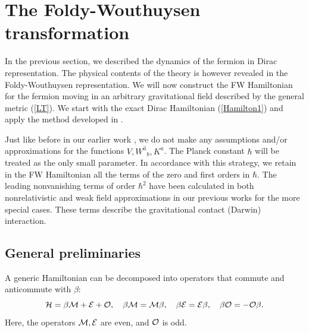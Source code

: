 \documentclass[preprint,showpacs,preprintnumbers,eqsecnum,amsmath,amssymb]{revtex4-1}
\begin{document}
\section{The Foldy-Wouthuysen transformation}\label{FW1}


In the previous section, we described the dynamics of the fermion in
Dirac representation. The physical contents of the theory is however
revealed in the Foldy-Wouthuysen representation. We will now construct
the FW \cite{FW} Hamiltonian for the fermion moving in an arbitrary
gravitational field described by the general metric (\ref{LT}). We
start with the exact Dirac Hamiltonian (\ref{Hamilton1}) and apply
the method developed in \cite{PRA}.

Just like before in our earlier work \cite{OST,ostrong}, we do not make any
assumptions and/or approximations for the functions $V, W^{\widehat a}{}_b, K^a$.
The Planck constant $\hbar$ will be treated as the only small parameter.
In accordance with this strategy, we retain in the FW Hamiltonian all the
terms of the zero and first orders in $\hbar$. The leading nonvanishing terms
of order $\hbar^2$ have been calculated in both nonrelativistic and weak
field approximations in our previous works \cite{PRD,OST,ostrong} for the more
special cases. These terms describe the gravitational contact (Darwin) interaction.


\subsection{General preliminaries}


A generic Hamiltonian can be decomposed into operators that commute and
anticommute with $\beta$:
\begin{equation}\label{Vvedenieq3}
{\cal H}=\beta {\cal M}+{\cal E}+{\cal O},\quad\beta{\cal M}={\cal M}\beta,
\quad\beta{\cal E}={\cal E}\beta,\quad\beta{\cal O}=-{\cal O}\beta.
\end{equation}
Here, the operators ${\cal M},{\cal E}$ are even, and ${\cal O}$ is odd.
\end{document}
